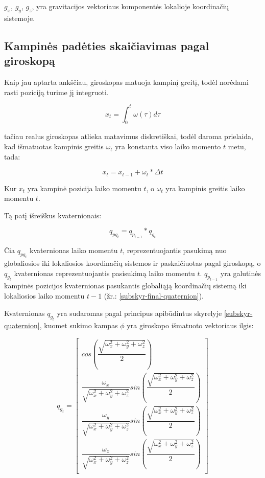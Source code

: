 \documentclass[12pt, a4paper, lithuanian, final]{article}
\begin{document}
$g_x$, $g_y$, $g_z$, yra gravitacijos vektoriaus komponentės lokalioje koordinačių sistemoje.



\subsection{Kampinės padėties skaičiavimas pagal giroskopą}

Kaip jau aptarta ankščiau, giroskopas matuoja kampinį greitį, todėl norėdami rasti poziciją turime jį integruoti.

\begin{equation}
	x_t = \int_0^t \omega(\tau) d\tau
\end{equation}

tačiau realus giroskopas atlieka matavimus diskretiškai, todėl daroma prielaida, kad išmatuotas kampinis greitis $\omega_t$ yra konstanta viso laiko momento $t$ metu, tada:

\begin{equation}
	x_t = x_{t-1} + \omega_t * \Delta t
\end{equation}

Kur $x_t$ yra kampinė pozicija laiko momentu $t$, o $\omega_t$ yra kampinis greitis laiko momentu $t$.

Tą patį išreiškus kvaternionais:

\begin{equation}
	q_{pg_{t}} = q_{p_{t - 1}} * q_{g_{t}}
\end{equation}

Čia $q_{pg_{t}}$ kvaternionas laiko momentu $t$, reprezentuojantis pasukimą nuo globaliosios iki lokaliosios koordinačių sistemos ir paskaičiuotas pagal giroskopą, o $q_{g_{t}}$ kvaternionas reprezentuojantis pasisukimą laiko momentu $t$.
$q_{p_{t-1}}$ yra galutinės kampinės pozicijos kvaternionas pasukantis globaliąją koordinačių sistemą iki lokaliosios laiko momentu $t-1$ (žr.: \ref{subskyr-final-quaternion}).

Kvaternionas $q_{g_{t}}$ yra sudaromas pagal principus apibūdintus skyrelyje \ref{subskyr-quaternion}, kuomet sukimo kampas $\phi$ yra giroskopo išmatuoto vektoriaus ilgis:

\begin{equation}
	q_{g_{t}} = \left[
		\begin{array}{c}
			cos\left(\dfrac{\sqrt{\omega_x^2 + \omega_y^2 + \omega_z^2}}{2}\right) \\
			\dfrac{\omega_x}{\sqrt{\omega_x^2 + \omega_y^2 + \omega_z^2}} sin\left(\dfrac{\sqrt{\omega_x^2 + \omega_y^2 + \omega_z^2}}{2}\right) \\
			\dfrac{\omega_y}{\sqrt{\omega_x^2 + \omega_y^2 + \omega_z^2}} sin\left(\dfrac{\sqrt{\omega_x^2 + \omega_y^2 + \omega_z^2}}{2}\right) \\
			\dfrac{\omega_z}{\sqrt{\omega_x^2 + \omega_y^2 + \omega_z^2}} sin\left(\dfrac{\sqrt{\omega_x^2 + \omega_y^2 + \omega_z^2}}{2}\right) \\
		\end{array}
	\right]
\label{for-gyro-quat}
\end{equation}
\end{document}
